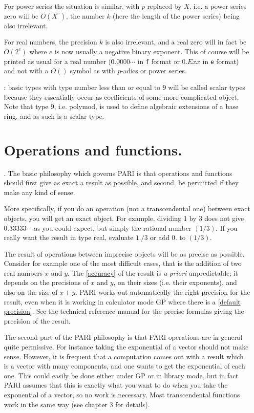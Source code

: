 For power series the situation is similar, with $p$ replaced
by $X$, i.e. a power series zero will be $O(X^e)$, the number $k$ (here the
length of the power series) being also irrelevant.

For real numbers, the precision $k$ is also irrelevant,
and a real zero will in fact be $O(2^e)$ where $e$ is now usually a
negative binary exponent. This of course will be printed as usual for
a real number ($0.0000\cdots$ in {\tt f} format or $0.Exx$ in {\tt e} format)
and not with a $O()$ symbol as with $p$-adics or power series.

: basic types with type number less than or equal
to 9 will be called scalar types because they essentially occur as
coefficients of some more complicated object. Note that type 9, i.e. polymod,
is used to define algebraic extensions of a base ring, and as such is
a scalar type.

\section{Operations and functions.}

.
The basic philosophy which governs PARI is that operations and functions
should first give as exact a result as possible, and second, be permitted
if they make any kind of sense.

More specifically, if you do an operation (not a transcendental one)
between exact objects, you will get an exact object. For example,
dividing 1 by 3 does not give $0.33333\cdots$ as you could expect,
but simply the rational number $(1/3)$. If you really want the result
in type real, evaluate $1./3$ or add $0.$ to $(1/3)$.

The result of operations between imprecise objects will be as precise
as possible. Consider for example one of the most difficult cases, that is
the addition of two real numbers $x$ and $y$. The \ref{accuracy} of the result is
{\it a priori\/} unpredictable; it depends on the precisions of $x$ and $y$, on
their sizes (i.e. their exponents), and also on the size of $x+y$. PARI
works out automatically the right precision for the result, even when it
is working in calculator mode GP where there is a \ref{default precision}.
See the technical reference manual for the precise formulas giving the
precision of the result.

The second part of the PARI philosophy is that PARI operations are in
general quite permissive. For instance taking the exponential of a vector
should not make sense. However, it is frequent that a computation comes
out with a result which is a vector with many components, and one wants
to get the exponential of each one. This could easily be done
either under GP or in library mode, but in fact PARI assumes
that this is exactly what you want to do when you take the exponential of a
vector, so no work is necessary. Most transcendental functions work in the
same way (see chapter 3 for details).

